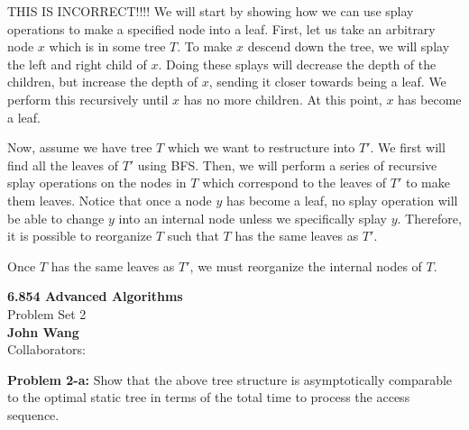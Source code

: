 \documentclass[psamsfonts]{amsart}
\newenvironment{sol}{\vspace{0.25cm}{\large \bfseries Solution:}}{\qedsymbol}
\newenvironment{prob}[1]{\begin{framed}{\large \bfseries Problem #1:}}{\end{framed}}
\newcommand{\makenewtitle}{
\begin{center}
{\huge \bfseries 6.854 Advanced Algorithms} \\
Problem Set 2\\
\vspace{0.25cm}
{\bfseries John Wang} \\
Collaborators:
\end{center}
\vspace{0.5cm}
}
\begin{document}
\begin{sol}
THIS IS INCORRECT!!!!
We will start by showing how we can use splay operations to make a specified node into a leaf. First, let us take an arbitrary node $x$ which is in some tree $T$. To make $x$ descend down the tree, we will splay the left and right child of $x$. Doing these splays will decrease the depth of the children, but increase the depth of $x$, sending it closer towards being a leaf. We perform this recursively until $x$ has no more children. At this point, $x$ has become a leaf. 

Now, assume we have tree $T$ which we want to restructure into $T'$. We first will find all the leaves of $T'$ using BFS. Then, we will perform a series of recursive splay operations on the nodes in $T$ which correspond to the leaves of $T'$ to make them leaves. Notice that once a node $y$ has become a leaf, no splay operation will be able to change $y$ into an internal node unless we specifically splay $y$. Therefore, it is possible to reorganize $T$ such that $T$ has the same leaves as $T'$. 

Once $T$ has the same leaves as $T'$, we must reorganize the internal nodes of $T$. 

\end{sol}

\newpage

\makenewtitle

\begin{prob}{2-a}
Show that the above tree structure is asymptotically comparable to the optimal static tree in terms of the total time to process the access sequence.
\end{prob}
\end{document}
